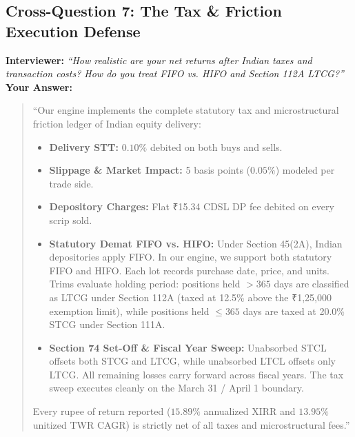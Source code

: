 \documentclass[11pt,a4paper]{article}
\begin{document}
\subsection{Cross-Question 7: The Tax \& Friction Execution Defense}
\textbf{Interviewer:} \textit{``How realistic are your net returns after Indian taxes and transaction costs? How do you treat FIFO vs. HIFO and Section 112A LTCG?''} \\
\textbf{Your Answer:}
\begin{quote}
``Our engine implements the complete statutory tax and microstructural friction ledger of Indian equity delivery:
\begin{itemize}
    \item \textbf{Delivery STT:} $0.10\%$ debited on both buys and sells.
    \item \textbf{Slippage \& Market Impact:} 5 basis points ($0.05\%$) modeled per trade side.
    \item \textbf{Depository Charges:} Flat ₹15.34 CDSL DP fee debited on every scrip sold.
    \item \textbf{Statutory Demat FIFO vs. HIFO:} Under Section 45(2A), Indian depositories apply FIFO. In our engine, we support both statutory FIFO and HIFO. Each lot records purchase date, price, and units. Trims evaluate holding period: positions held $> 365$ days are classified as LTCG under Section 112A (taxed at 12.5\% above the ₹1,25,000 exemption limit), while positions held $\le 365$ days are taxed at 20.0\% STCG under Section 111A.
    \item \textbf{Section 74 Set-Off \& Fiscal Year Sweep:} Unabsorbed STCL offsets both STCG and LTCG, while unabsorbed LTCL offsets only LTCG. All remaining losses carry forward across fiscal years. The tax sweep executes cleanly on the March 31 / April 1 boundary.
\end{itemize}
Every rupee of return reported ($15.89\%$ annualized XIRR and $13.95\%$ unitized TWR CAGR) is strictly net of all taxes and microstructural fees.''
\end{quote}
\end{document}
